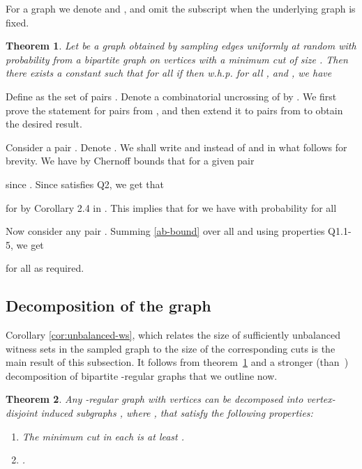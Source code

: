 \documentclass[11pt]{article}
\newtheorem{theorem}{Theorem}[section]
\newenvironment{proof}{{\bf Proof:}}{\par}
\begin{document}
For a graph  we denote  and , and omit the subscript when the
underlying graph is fixed.
\begin{theorem} \label{thm:ss}
Let  be a graph obtained by sampling edges uniformly at random with
probability  from a bipartite graph  on  vertices with a minimum cut of size
. Then there
exists a constant  such that for all  if 
then w.h.p. for all , and , we have

\end{theorem}
\begin{proof}
Define  as the set of pairs . Denote a combinatorial uncrossing of  by .
We first prove the statement for pairs from , and then extend it to pairs from  to obtain the desired result.

Consider a pair .  Denote . We shall write  and  instead of  and  in what follows for brevity. We have by Chernoff bounds that for a given pair  

since . Since  satisfies Q2, we get that

for  by Corollary 2.4 in \cite{kar94a}. This implies that for  we have with probability  for all 
 

Now consider any pair . Summing \eqref{ab-bound} over all  and using properties Q1.1-5, we get
 
for all  as required.
\end{proof}

 
\subsection{Decomposition of the graph } \label{subsec:decomp}
Corollary \ref{cor:unbalanced-ws}, which relates
the size of sufficiently unbalanced witness sets in the sampled graph to the
size of the corresponding cuts is the main result of this subsection. It follows from theorem~\ref{thm:ss} and a stronger
(than~\cite{gkk:rbp08}) decomposition of bipartite -regular graphs that we outline now.
\begin{theorem} \label{thm:decomposition}
Any -regular graph  with  vertices can be decomposed into
 vertex-disjoint induced subgraphs , where , that satisfy the following properties:

\begin{enumerate}
 \item The minimum cut in each  is at least .



 \item .
\end{enumerate}
\end{theorem}
\end{document}
